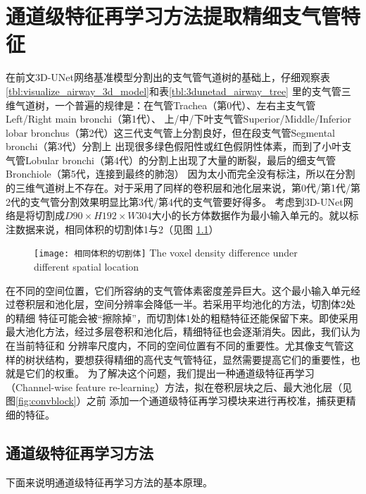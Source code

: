 
\chapter{通道级特征再学习方法提取精细支气管特征}\label{chap:feature_relearning}

在前文3D-UNet网络基准模型分割出的支气管气道树的基础上，仔细观察表\ref{tbl:visualize_airway_3d_model}和表\ref{tbl:3dunetad_airway_tree}
里的支气管三维气道树，一个普遍的规律是：在气管Trachea（第0代）、左右主支气管Left/Right main bronchi（第1代）、
上/中/下叶支气管Superior/Middle/Inferior lobar bronchus（第2代）这三代支气管上分割良好，但在段支气管Segmental bronchi（第3代）分割上
出现很多绿色假阳性或红色假阴性体素，而到了小叶支气管Lobular bronchi（第4代）的分割上出现了大量的断裂，最后的细支气管Bronchiole（第5代，连接到最终的肺泡）
因为太小而完全没有标注，所以在分割的三维气道树上不存在。对于采用了同样的卷积层和池化层来说，第0代/第1代/第2代的支气管分割效果明显比第3代/第4代的支气管要好得多。
考虑到3D-UNet网络是将切割成$D90 \times H192 \times W304$大小的长方体数据作为最小输入单元的。就以标注数据来说，相同体积的切割体1与2（见图
\ref{fig:voxel_density_diffs}）
\begin{figure}[h]
    \centering
    \texttt{[image: 相同体积的切割体]}
        {The voxel density difference under different spatial location}
    \label{fig:voxel_density_diffs}
\end{figure}
在不同的空间位置，它们所容纳的支气管体素密度差异巨大。这个最小输入单元经过卷积层和池化层，空间分辨率会降低一半。若采用平均池化的方法，切割体2处的精细
特征可能会被“擦除掉”，而切割体1处的粗糙特征还能保留下来。即使采用最大池化方法，经过多层卷积和池化后，精细特征也会逐渐消失。因此，我们认为在当前特征和
分辨率尺度内，不同的空间位置有不同的重要性。尤其像支气管这样的树状结构，要想获得精细的高代支气管特征，显然需要提高它们的重要性，也就是它们的权重。
为了解决这个问题，我们提出一种通道级特征再学习（Channel-wise feature re-learning）方法，拟在卷积层块之后、最大池化层（见图\ref{fig:convblock}）之前
添加一个通道级特征再学习模块来进行再校准，捕获更精细的特征。

\section{通道级特征再学习方法}
下面来说明通道级特征再学习方法的基本原理。

